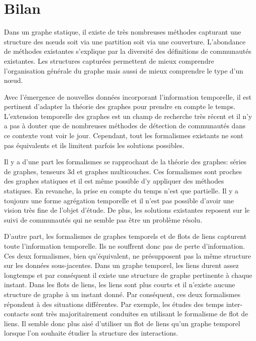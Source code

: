 \section{Bilan}

Dans un graphe statique, il existe de très nombreuses méthodes capturant une structure des n\oe uds soit via une partition soit via une couverture.
L'abondance de méthodes existantes s'explique par la diversité des définitions de communautés existantes.
Les structures capturées permettent de mieux comprendre l'organisation générale du graphe mais aussi de mieux comprendre le type d'un n\oe ud.


Avec l'émergence de nouvelles données incorporant l'information temporelle, il est pertinent d'adapter la théorie des graphes pour prendre en compte le temps.
L'extension temporelle des graphes est un champ de recherche très récent et il n'y a pas à douter que de nombreuses méthodes de détection de communautés dans ce contexte vont voir le jour.
Cependant, tout les formalismes existants ne sont pas équivalents et ils limitent parfois les solutions possibles.


Il y a d'une part les formalismes se rapprochant de la théorie des graphes: séries de graphes, tenseurs 3d et graphes multicouches.
Ces formalismes sont proches des graphes statiques et il est même possible d'y appliquer des méthodes statiques.
En revanche, la prise en compte du temps n'est que partielle.
Il y a toujours une forme agrégation temporelle et il n'est pas possible d'avoir une vision très fine de l'objet d'étude.
De plus, les solutions existantes reposent sur le suivi de communautés qui ne semble pas être un problème résolu.


D'autre part, les formalismes de graphes temporels et de flots de liens capturent toute l'information temporelle.
Ils ne souffrent donc pas de perte d'information.
Ces deux formalismes, bien qu'équivalent, ne présupposent pas la même structure sur les données sous-jacentes.
Dans un graphe temporel, les liens durent assez longtemps et par conséquent il existe une structure de graphe pertinente à chaque instant.
Dans les flots de liens, les liens sont plus courts et il n'existe aucune structure de graphe à un instant donné.
Par conséquent, ces deux formalismes répondent à des situations différentes.
Par exemple, les études des temps inter-contacts sont très majoritairement conduites en utilisant le formalisme de flot de liens.
Il semble donc plus aisé d'utiliser un flot de liens qu'un graphe temporel lorsque l'on souhaite étudier la structure des interactions.



